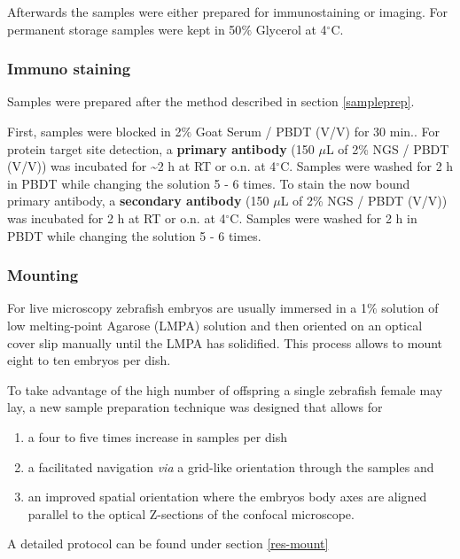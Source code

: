 \documentclass[10pt, b5paper, singlespacinge, twoside]{reedthesis} %
\providecommand{\tightlist}{%
  \setlength{\itemsep}{0pt}\setlength{\parskip}{0pt}}
\theoremstyle{definition}
\theoremstyle{definition}
\theoremstyle{definition}
\theoremstyle{remark}
\begin{document}
Afterwards the samples were either prepared for immunostaining or imaging. For permanent storage samples were kept in 50\(\%\) Glycerol at 4\(^\circ\)C.

\hypertarget{immuno-met}{%
\subsubsection{Immuno staining}\label{immuno-met}}

Samples were prepared after the method described in section \ref{sampleprep}.

First, samples were blocked in 2\(\%\) Goat Serum / PBDT (V/V) for 30 min.. For protein target site detection, a \textbf{primary antibody} (150 \(\mu\)L of 2\% NGS / PBDT (V/V)) was incubated for \textasciitilde2 h at RT or o.n. at 4\(^\circ\)C. Samples were washed for 2 h in PBDT while changing the solution 5 - 6 times. To stain the now bound primary antibody, a \textbf{secondary antibody} (150 \(\mu\)L of 2\% NGS / PBDT (V/V)) was incubated for 2 h at RT or o.n. at 4\(^\circ\)C. Samples were washed for 2 h in PBDT while changing the solution 5 - 6 times.

\hypertarget{mount-met}{%
\subsubsection{Mounting}\label{mount-met}}

For live microscopy zebrafish embryos are usually immersed in a 1\(\%\) solution of low melting-point Agarose (LMPA) solution and then oriented on an optical cover slip manually until the LMPA has solidified. This process allows to mount eight to ten embryos per dish.

To take advantage of the high number of offspring a single zebrafish female may lay, a new sample preparation technique was designed that allows for
\begin{enumerate}
\def\labelenumi{\arabic{enumi}.}
\tightlist
\item
  a four to five times increase in samples per dish
\item
  a facilitated navigation \emph{via} a grid-like orientation through the samples and
\item
  an improved spatial orientation where the embryos body axes are aligned parallel to the optical Z-sections of the confocal microscope.
\end{enumerate}
A detailed protocol can be found under section \ref{res-mount}
\end{document}
